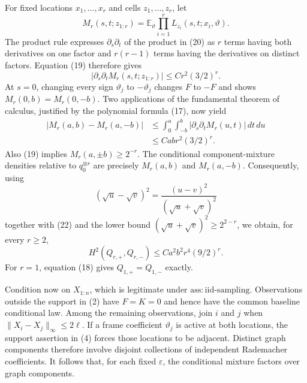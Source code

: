 For fixed locations \(x_1,\ldots,x_r\) and cells \(z_1,\ldots,z_r\), let
\[
 M_r(s,t;z_{1:r})
 =\mathbb E_\vartheta\prod_{i=1}^r
 L_{z_i}(s,t;x_i,\vartheta).                                    \tag{20}
\]
The product rule expresses \(\partial_s\partial_t\) of the product in (20) as \(r\) terms having both derivatives on one factor and \(r(r-1)\) terms having the derivatives on distinct factors.  Equation (19) therefore gives
\[
 |\partial_s\partial_tM_r(s,t;z_{1:r})|
 \le Cr^2(3/2)^r.                                                \tag{21}
\]
At \(s=0\), changing every sign \(\vartheta_j\) to \(-\vartheta_j\) changes \(F\) to \(-F\) and shows \(M_r(0,b)=M_r(0,-b)\).  Two applications of the fundamental theorem of calculus, justified by the polynomial formula (17), now yield
\[
\begin{aligned}
 |M_r(a,b)-M_r(a,-b)|
 &\le\int_0^a\int_{-b}^b
 |\partial_s\partial_tM_r(u,t)|\,dt\,du\\
 &\le Cabr^2(3/2)^r.                                             \tag{22}
\end{aligned}
\]
Also (19) implies \(M_r(a,\pm b)\ge2^{-r}\).  The conditional component-mixture densities relative to \(q_0^{\otimes r}\) are precisely \(M_r(a,b)\) and \(M_r(a,-b)\).  Consequently, using
\[
 (\sqrt u-\sqrt v)^2=\frac{(u-v)^2}{(\sqrt u+\sqrt v)^2}
\]
together with (22) and the lower bound \((\sqrt u+\sqrt v)^2\ge 2^{2-r}\), we obtain, for every \(r\ge2\),
\[
 H^2(Q_{r,+},Q_{r,-})
 \le Ca^2b^2r^4(9/2)^r.                                        \tag{23}
\]
For \(r=1\), equation (18) gives \(Q_{1,+}=Q_{1,-}\) exactly.

Condition now on \(X_{1:n}\), which is legitimate under \(\mathrm{ass:iid\mbox{-}sampling}\).  Observations outside the support in (2) have \(F=K=0\) and hence have the common baseline conditional law.  Among the remaining observations, join \(i\) and \(j\) when \(\lVert X_i-X_j\rVert_\infty\le2\ell\).  If a frame coefficient \(\vartheta_j\) is active at both locations, the support assertion in (4) forces those locations to be adjacent.  Distinct graph components therefore involve disjoint collections of independent Rademacher coefficients.  It follows that, for each fixed \(\varepsilon\), the conditional mixture factors over graph components.

